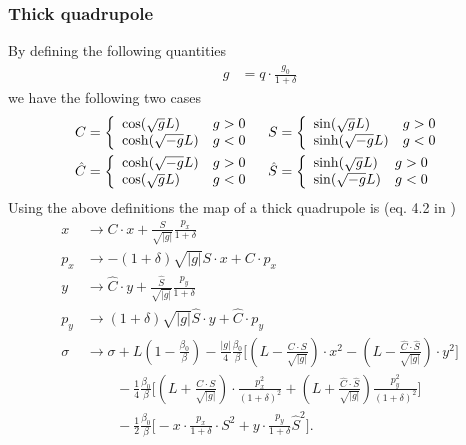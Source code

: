 \documentclass[english]{article}
\begin{document}
\subsubsection{Thick quadrupole}
\noindent By defining the following quantities
\begin{align}
  g &= q \cdot \frac{g_0}{1+\delta}
\end{align}
we have the following two cases
\begin{align}
    C &= \left\{
         \begin{array}{l l}
             \cos(\sqrt{g}L)  & g > 0 \\
             \cosh(\sqrt{-g}L) & g < 0
         \end{array}
         \right. &
    S &= \left\{
         \begin{array}{l l}
             \sin(\sqrt{g}L)  & g > 0 \\
             \sinh(\sqrt{-g}L) & g < 0
         \end{array}
         \right. \\
    \hat{C} &= \left\{
         \begin{array}{l l}
             \cosh(\sqrt{-g}L)  & g > 0 \\
             \cos(\sqrt{g}L) & g < 0
         \end{array}
         \right. &
    \hat{S} &= \left\{
         \begin{array}{l l}
             \sinh(\sqrt{g}L)  & g > 0 \\
             \sin(\sqrt{-g}L) & g < 0
         \end{array}
         \right.
\end{align}
Using the above definitions the map of a thick quadrupole is (eq. 4.2 in \cite{barber87})
\begin{align}
  x   &\to C \cdot x + \frac{S}{\sqrt{|g|}} \frac{p_x}{1+\delta} \\
  p_x &\to - (1+\delta) \sqrt{|g|} S \cdot x + C \cdot p_x \\
  y   &\to \hat C \cdot y + \frac{\hat S}{\sqrt{|g|}} \frac{p_y}{1+\delta} \\
  p_y &\to (1+\delta)\sqrt{|g|} \hat S \cdot y + \hat C \cdot p_y \\
  \sigma &\to \sigma + L \left(1 - \frac{\beta_0}{\beta} \right)
  - \frac{|g|}{4} \frac{\beta_0}{\beta} \Bigg[\left(L-\frac{C\cdot S}{\sqrt{|g|}} \right) \cdot x^2
  - \left(L-\frac{\hat{C}\cdot\hat{S}}{\sqrt{|g|}} \right) \cdot y^2 \Bigg] \\
  & \,\qquad- \frac{1}{4}\frac{\beta_0}{\beta} \Bigg[ \left(L
  + \frac{C\cdot S}{\sqrt{|g|}}\right) \cdot \frac{p_x^2}{(1+\delta)^2}
  + \left(L + \frac{\hat{C}\cdot\hat{S}}{\sqrt{|g|}} \right) \frac{p_y^2}{(1+\delta)^2} \Bigg] \\
  & \,\qquad- \frac{1}{2}\frac{\beta_0}{\beta}\Bigg[-x\cdot\frac{p_x}{1+\delta} \cdot S^2 
  + y\cdot\frac{p_y}{1+\delta} \hat{S}^2 \Bigg].
\end{align}
\end{document}

